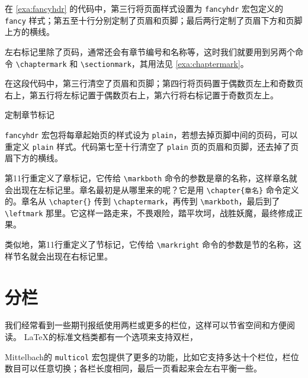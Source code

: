在 \autoref{exa:fancyhdr} 的代码中，第三行将页面样式设置为 \texttt{fancyhdr} 宏包定义的 \texttt{fancy} 样式；第五至十行分别定制了页眉和页脚；最后两行定制了页眉下方和页脚上方的横线。

左右标记里除了页码，通常还会有章节编号和名称等，这时我们就要用到另两个命令 \verb|\chaptermark| 和 \verb|\sectionmark|，其用法见 \autoref{exa:chaptermark}。

在这段代码中，第三行清空了页眉和页脚；第四行将页码置于偶数页左上和奇数页右上，第五行将左标记置于偶数页右上，第六行将右标记置于奇数页左上。

\begin{example}[h]
\caption{定制章节标记}
\label{exa:chaptermark}
\end{example}

\texttt{fancyhdr} 宏包将每章起始页的样式设为 \texttt{plain}，若想去掉页脚中间的页码，可以重定义 \texttt{plain} 样式。代码第七至十行清空了 \texttt{plain} 页的页眉和页脚，还去掉了页眉下方的横线。

第11行重定义了章标记，它传给 \verb|\markboth| 命令的参数是章的名称，这样章名就会出现在左标记里。章名最初是从哪里来的呢？它是用 \verb|\chapter{章名}| 命令定义的。章名从 \verb|\chapter{}| 传到 \verb|\chaptermark|，再传到 \verb|\markboth|，最后到了 \verb|\leftmark| 那里。它这样一路走来，不畏艰险，踏平坎坷，战胜妖魔，最终修成正果。

类似地，第11行重定义了节标记，它传给 \verb|\markright| 命令的参数是节的名称，这样节名就会出现在右标记里。

\section{分栏}

我们经常看到一些期刊报纸使用两栏或更多的栏位，这样可以节省空间和方便阅读。 \LaTeX 的标准文档类都有一个选项来支持双栏，


Mittelbach\indexMittelbach 的 \texttt{multicol} 宏包提供了更多的功能，比如它支持多达十个栏位，栏位数目可以任意切换；各栏长度相同，最后一页看起来会左右平衡一些。


